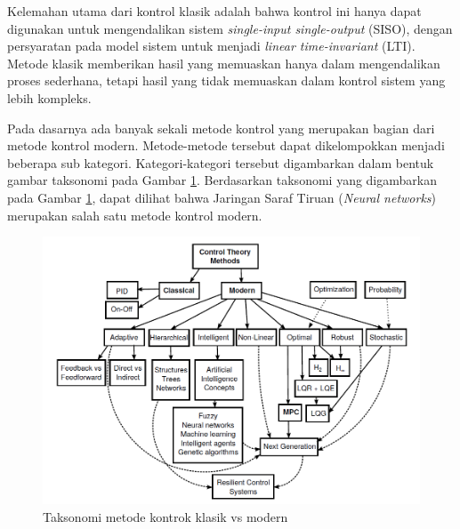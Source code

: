 Kelemahan utama dari kontrol klasik adalah bahwa kontrol ini hanya dapat digunakan untuk mengendalikan sistem \textit{single-input single-output} (SISO), dengan persyaratan pada model sistem untuk menjadi \textit{linear time-invariant} (LTI). Metode klasik memberikan hasil yang memuaskan hanya dalam mengendalikan proses sederhana, tetapi hasil yang tidak memuaskan dalam kontrol sistem yang lebih kompleks.\cite{MPCDissertation}

Pada dasarnya ada banyak sekali metode kontrol yang merupakan bagian dari metode kontrol modern. Metode-metode tersebut dapat dikelompokkan menjadi beberapa sub kategori. Kategori-kategori tersebut digambarkan dalam bentuk gambar taksonomi pada Gambar \ref{fig:3:ControlSystemTaxonomy}. Berdasarkan taksonomi yang digambarkan pada Gambar \ref{fig:3:ControlSystemTaxonomy}, dapat dilihat bahwa Jaringan Saraf Tiruan (\textit{Neural networks}) merupakan salah satu metode kontrol modern.

\begin{figure}[!h]
	\centering
	\includegraphics[width=1\textwidth]{figures/ControlSystemTaxonomy}
	\caption{Taksonomi metode kontrok klasik vs modern \cite{NNControlBook}}
	\label{fig:3:ControlSystemTaxonomy}
\end{figure}
